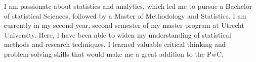 


I am passionate about statistics and analytics, which led me to pursue a Bachelor of statistical Sciences, followed by a Master of Methodology and Statistics. I am currently in my second year, second semester of my master program at Utrecht University. Here, I have been able to widen my understanding of statistical methods and research techniques. I learned valuable critical thinking and problem-solving skills that would make me a great addition to the PwC.